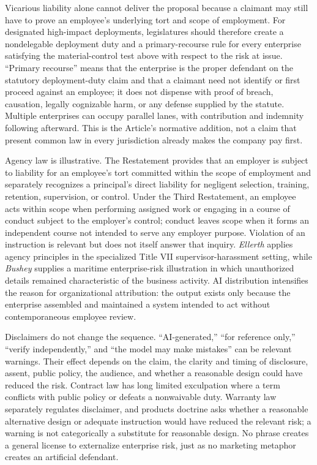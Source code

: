 Vicarious liability alone cannot deliver the proposal because a claimant may still have to prove an employee's underlying tort and scope of employment. For designated high-impact deployments, legislatures should therefore create a nondelegable deployment duty and a primary-recourse rule for every enterprise satisfying the material-control test above with respect to the risk at issue. ``Primary recourse'' means that the enterprise is the proper defendant on the statutory deployment-duty claim and that a claimant need not identify or first proceed against an employee; it does not dispense with proof of breach, causation, legally cognizable harm, or any defense supplied by the statute. Multiple enterprises can occupy parallel lanes, with contribution and indemnity following afterward. This is the Article's normative addition, not a claim that present common law in every jurisdiction already makes the company pay first.

Agency law is illustrative. The Restatement provides that an employer is subject to liability for an employee's tort committed within the scope of employment and separately recognizes a principal's direct liability for negligent selection, training, retention, supervision, or control. Under the Third Restatement, an employee acts within scope when performing assigned work or engaging in a course of conduct subject to the employer's control; conduct leaves scope when it forms an independent course not intended to serve any employer purpose. Violation of an instruction is relevant but does not itself answer that inquiry. \emph{Ellerth} applies agency principles in the specialized Title VII supervisor-harassment setting, while \emph{Bushey} supplies a maritime enterprise-risk illustration in which unauthorized details remained characteristic of the business activity. AI distribution intensifies the reason for organizational attribution: the output exists only because the enterprise assembled and maintained a system intended to act without contemporaneous employee review.

Disclaimers do not change the sequence. ``AI-generated,'' ``for reference only,'' ``verify independently,'' and ``the model may make mistakes'' can be relevant warnings. Their effect depends on the claim, the clarity and timing of disclosure, assent, public policy, the audience, and whether a reasonable design could have reduced the risk. Contract law has long limited exculpation where a term conflicts with public policy or defeats a nonwaivable duty. Warranty law separately regulates disclaimer, and products doctrine asks whether a reasonable alternative design or adequate instruction would have reduced the relevant risk; a warning is not categorically a substitute for reasonable design. No phrase creates a general license to externalize enterprise risk, just as no marketing metaphor creates an artificial defendant.

